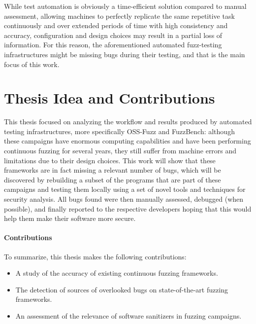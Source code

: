 While test automation is obviously a time-efficient solution compared to manual assessment, allowing machines to perfectly replicate the same repetitive task continuously and over extended periods of time with high consistency and accuracy, configuration and design choices may result in a partial loss of information. For this reason, the aforementioned automated fuzz-testing infrastructures might be missing bugs during their testing, and that is the main focus of this work.  




\section{Thesis Idea and Contributions}
This thesis focused on analyzing the workflow and results produced by automated testing infrastructures, more specifically OSS-Fuzz and FuzzBench: although these campaigns have enormous computing capabilities and have been performing continuous fuzzing for several years, they still suffer from machine errors and limitations due to their design choices. This work will show that these frameworks are in fact missing a relevant number of bugs, which will be discovered by rebuilding a subset of the programs that are part of these campaigns and testing them locally using a set of novel tools and techniques for security analysis. All bugs found were then manually assessed, debugged (when possible), and finally reported to the respective developers hoping that this would help them make their software more secure.


\paragraph{Contributions}
To summarize, this thesis makes the following contributions:
\begin{itemize}
    \item A study of the accuracy of existing continuous fuzzing frameworks.
    \item The detection of sources of overlooked bugs on state-of-the-art fuzzing frameworks.
    \item An assessment of the relevance of software sanitizers in fuzzing campaigns.
\end{itemize}




